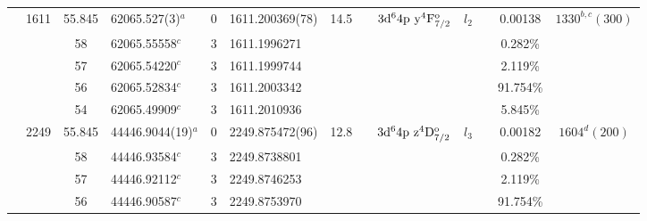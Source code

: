 \begin{table*}
\begin{center}
{\begin{tabular}{:l;l;c;l;c;l;c;l;l;c;c;c;c}
                                  & 1611   & 55.845    & 62065.527(3)$^{a}$               & 0 &   1611.200369(78)  & 14.5 & $                                        $ & $3\rm{d}^64\rm{p~y}^4\rm{F}_{7/2}^{\rm o}$ & $l_{2} $ &              & 0.00138   & $ 1330^{b,c}(300)$\\
\rowstyle{\itshape}               &        & 58        & 62065.55558$^{c}$                & 3 &  1611.1996271      &      & $                                        $ & $                                        $ & $      $ &              & 0.282\%   & $     ^{}     $\\
\rowstyle{\itshape}               &        & 57        & 62065.54220$^{c}$                & 3 &  1611.1999744      &      & $                                        $ & $                                        $ & $      $ &              & 2.119\%   & $     ^{}     $\\
\rowstyle{\itshape}               &        & 56        & 62065.52834$^{c}$                & 3 &  1611.2003342      &      & $                                        $ & $                                        $ & $      $ &              & 91.754\%  & $     ^{}     $\\
\rowstyle{\itshape}               &        & 54        & 62065.49909$^{c}$                & 3 &  1611.2010936      &      & $                                        $ & $                                        $ & $      $ &              & 5.845\%   & $     ^{}     $\\
                                  & 2249   & 55.845    & 44446.9044(19)$^{a}$             & 0 &   2249.875472(96)  & 12.8 & $                                        $ & $3\rm{d}^64\rm{p~z}^4\rm{D}_{7/2}^{\rm o}$ & $l_{3} $ &              & 0.00182   & $ 1604^{d}(200)$\\
\rowstyle{\itshape}               &        & 58        & 44446.93584$^{c}$                & 3 &  2249.8738801      &      & $                                        $ & $                                        $ & $      $ &              & 0.282\%   & $     ^{}     $\\
\rowstyle{\itshape}               &        & 57        & 44446.92112$^{c}$                & 3 &  2249.8746253      &      & $                                        $ & $                                        $ & $      $ &              & 2.119\%   & $     ^{}     $\\
\rowstyle{\itshape}               &        & 56        & 44446.90587$^{c}$                & 3 &  2249.8753970      &      & $                                        $ & $                                        $ & $      $ &              & 91.754\%  & $     ^{}     $\\

\end{tabular}}
\end{center}
\end{table*}
